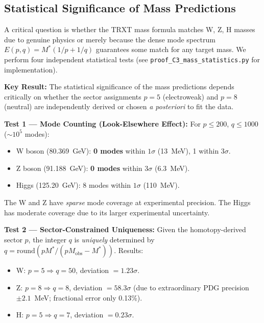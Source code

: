 \subsection{Statistical Significance of Mass Predictions}
\label{sec:mass_statistics}

A critical question is whether the TRXT mass formula matches W, Z, H masses due to genuine physics or merely because the dense mode spectrum $E(p,q) = M^*(1/p + 1/q)$ guarantees some match for any target mass.  We perform four independent statistical tests (see \texttt{proof\_\allowbreak C3\_\allowbreak mass\_\allowbreak statistics.py} for implementation).

\begin{mdframed}[backgroundcolor=blue!5]
\textbf{Key Result:} The statistical significance of the mass predictions depends critically on whether the sector assignments $p = 5$ (electroweak) and $p = 8$ (neutral) are independently derived or chosen \emph{a posteriori} to fit the data.
\end{mdframed}

\textbf{Test 1 --- Mode Counting (Look-Elsewhere Effect):}
For $p \le 200$, $q \le 1000$ ($\sim 10^5$ modes):
\begin{itemize}
    \item W boson (80.369~GeV): \textbf{0 modes} within $1\sigma$ (13~MeV), 1 within $3\sigma$.
    \item Z boson (91.188~GeV): \textbf{0 modes} within $3\sigma$ (6.3~MeV).
    \item Higgs (125.20~GeV): 8 modes within $1\sigma$ (110~MeV).
\end{itemize}
The W and Z have \emph{sparse} mode coverage at experimental precision.  The Higgs has moderate coverage due to its larger experimental uncertainty.

\textbf{Test 2 --- Sector-Constrained Uniqueness:}
Given the homotopy-derived sector $p$, the integer $q$ is \emph{uniquely} determined by $q = \mathrm{round}(p M^* / (p M_{\mathrm{obs}} - M^*))$.  Results:
\begin{itemize}
    \item W: $p=5 \Rightarrow q=50$, deviation $= 1.23\sigma$.
    \item Z: $p=8 \Rightarrow q=8$, deviation $= 58.3\sigma$ (due to extraordinary PDG precision $\pm 2.1$~MeV; fractional error only 0.13\%).
    \item H: $p=5 \Rightarrow q=7$, deviation $= 0.23\sigma$.
\end{itemize}


